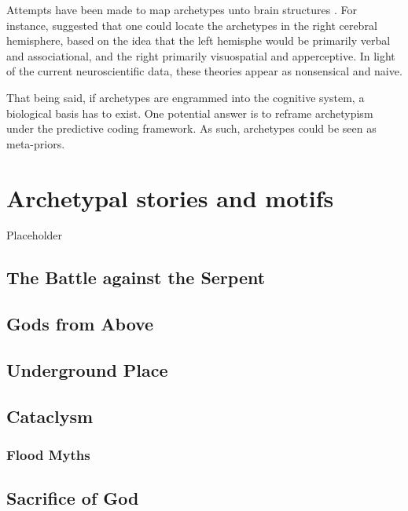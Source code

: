 \documentclass[
]{book}
\begin{document}
Attempts have been made to map archetypes unto brain structures \citep{samuels2003jung}. For instance, \citet{rossi1977cerebral} suggested that one could locate the archetypes in the right cerebral hemisphere, based on the idea that the left hemisphe would be primarily verbal and associational, and the right primarily visuospatial and apperceptive. In light of the current neuroscientific data, these theories appear as nonsensical and naive.

That being said, if archetypes are engrammed into the cognitive system, a biological basis has to exist. One potential answer is to reframe archetypism under the predictive coding framework. As such, archetypes could be seen as meta-priors.

\hypertarget{archetypal-stories-and-motifs}{%
\chapter{Archetypal stories and motifs}\label{archetypal-stories-and-motifs}}

Placeholder

\hypertarget{the-battle-against-the-serpent}{%
\section{The Battle against the Serpent}\label{the-battle-against-the-serpent}}

\hypertarget{gods-from-above}{%
\section{Gods from Above}\label{gods-from-above}}

\hypertarget{underground-place}{%
\section{Underground Place}\label{underground-place}}

\hypertarget{cataclysm}{%
\section{Cataclysm}\label{cataclysm}}

\hypertarget{flood-myths}{%
\subsection{Flood Myths}\label{flood-myths}}

\hypertarget{sacrifice-of-god}{%
\section{Sacrifice of God}\label{sacrifice-of-god}}
\end{document}
